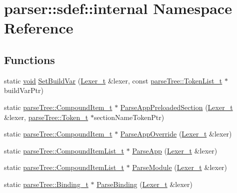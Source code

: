 \hypertarget{namespaceparser_1_1sdef_1_1internal}{}\section{parser\+:\+:sdef\+:\+:internal Namespace Reference}
\label{namespaceparser_1_1sdef_1_1internal}
\subsection*{Functions}
\begin{DoxyCompactItemize}
\item 
static \hyperlink{_t_e_m_p_l_a_t_e__cdef_8h_ac9c84fa68bbad002983e35ce3663c686}{void} \hyperlink{namespaceparser_1_1sdef_1_1internal_ac0d946ba249e1477ab6d209003778c6c}{Set\+Build\+Var} (\hyperlink{classparser_1_1_lexer__t}{Lexer\+\_\+t} \&lexer, const \hyperlink{structparse_tree_1_1_token_list__t}{parse\+Tree\+::\+Token\+List\+\_\+t} $\ast$build\+Var\+Ptr)
\item 
static \hyperlink{structparse_tree_1_1_compound_item__t}{parse\+Tree\+::\+Compound\+Item\+\_\+t} $\ast$ \hyperlink{namespaceparser_1_1sdef_1_1internal_a81a8a2cbd897b7a22acdd065484225d0}{Parse\+App\+Preloaded\+Section} (\hyperlink{classparser_1_1_lexer__t}{Lexer\+\_\+t} \&lexer, \hyperlink{structparse_tree_1_1_token__t}{parse\+Tree\+::\+Token\+\_\+t} $\ast$section\+Name\+Token\+Ptr)
\item 
static \hyperlink{structparse_tree_1_1_compound_item__t}{parse\+Tree\+::\+Compound\+Item\+\_\+t} $\ast$ \hyperlink{namespaceparser_1_1sdef_1_1internal_aaa19fc9d4ea03445026894bd09be27be}{Parse\+App\+Override} (\hyperlink{classparser_1_1_lexer__t}{Lexer\+\_\+t} \&lexer)
\item 
static \hyperlink{structparse_tree_1_1_compound_item_list__t}{parse\+Tree\+::\+Compound\+Item\+List\+\_\+t} $\ast$ \hyperlink{namespaceparser_1_1sdef_1_1internal_a94a4bb043466f8df261eeb23bd8183b3}{Parse\+App} (\hyperlink{classparser_1_1_lexer__t}{Lexer\+\_\+t} \&lexer)
\item 
static \hyperlink{structparse_tree_1_1_compound_item_list__t}{parse\+Tree\+::\+Compound\+Item\+List\+\_\+t} $\ast$ \hyperlink{namespaceparser_1_1sdef_1_1internal_a474ee0de597aca903eabfbcbc15ad322}{Parse\+Module} (\hyperlink{classparser_1_1_lexer__t}{Lexer\+\_\+t} \&lexer)
\item 
static \hyperlink{structparse_tree_1_1_binding__t}{parse\+Tree\+::\+Binding\+\_\+t} $\ast$ \hyperlink{namespaceparser_1_1sdef_1_1internal_a3d0b40e795061f9e97d86cf1ceb5192a}{Parse\+Binding} (\hyperlink{classparser_1_1_lexer__t}{Lexer\+\_\+t} \&lexer)

\end{DoxyCompactItemize}
